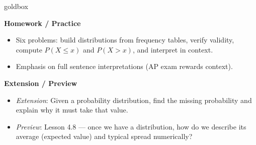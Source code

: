 \documentclass[10pt]{article}
\begin{document}
\begin{skillbox}{goldbox}
\begin{minipage}[t]{0.48\linewidth}
    \textbf{Homework / Practice}
    \begin{itemize}
        \item Six problems: build distributions from frequency tables, verify validity,
              compute $P(X \le x)$ and $P(X > x)$, and interpret in context.
        \item Emphasis on full sentence interpretations (AP exam rewards context).
    \end{itemize}
\end{minipage}
\hfill
\begin{minipage}[t]{0.48\linewidth}
    \textbf{Extension / Preview}
    \begin{itemize}
        \item \textit{Extension}: Given a probability distribution, find the missing
              probability and explain why it must take that value.
        \item \textit{Preview}: Lesson 4.8 --- once we have a distribution, how do we
              describe its average (expected value) and typical spread numerically?
    \end{itemize}
\end{minipage}
\end{skillbox}
\end{document}

